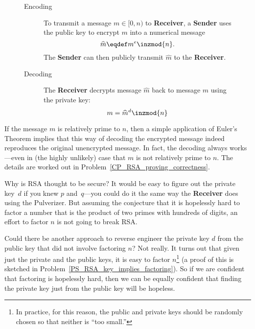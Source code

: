 \begin{figure}[p]
{\begin{minipage}{\textwidth}
\begin{description}
\item[Encoding]

\iffalse

Given a message~$m$, the sender first checks that $\gcd(m, n) =
1$.\footnote{It would be very bad if $\gcd(m, n)$ equals $p$ or $q$
  since then it would be easy for someone to use the encoded message
  to compute the private key If $\gcd(m, n) = n$, then the encoded
  message would be~0, which is fairly useless.  For very large values
  of~$n$, it is extremely unlikely that $\gcd(m, n) \ne 1$.  If this
  does happen, you should get a new set of keys or, at the very least,
  add some bits to~$m$ so that the resulting message is relatively
  prime to~$n$.}
\fi

To transmit a message $m \in [0,n)$ to \textbf{Receiver}, a \textbf{Sender} uses the public
  key to encrypt $m$ into a numerical message
\[
\widehat{m} \eqdef m^e \inzmod{n}. %
\]
The \textbf{Sender} can then publicly transmit $\widehat{m}$ to the \textbf{Receiver}.

\item[Decoding] The \textbf{Receiver} decrypts message $\widehat{m}$ back to message $m$ using the
  private key:
\[
m = \widehat{m}^d \inzmod{n} %
\]
\end{description}

\end{minipage}
}
\end{figure}

If the message $m$ is relatively prime to $n$, then a simple
application of Euler's Theorem implies that this way of decoding the
encrypted message indeed reproduces the original unencrypted message.
In fact, the decoding always works---even in (the highly unlikely)
case that $m$ is not relatively prime to $n$.  The details are worked
out in Problem~\ref{CP_RSA_proving_correctness}.

Why is RSA thought to be secure?  It would be easy to figure out the
private key~$d$ if you knew $p$ and~$q$---you could do it the same
way the \textbf{Receiver} does using the Pulverizer.  But assuming the
conjecture that it is hopelessly hard to factor a number that is the
product of two primes with hundreds of digits, an effort to factor $n$
is not going to break RSA.

Could there be another approach to reverse engineer the private key
$d$ from the public key that did not involve factoring $n$?  Not
really.  It turns out that given just the private and the public keys,
it is easy to factor $n$\footnote{In practice, for this reason, the
  public and private keys should be randomly chosen so that neither is
  ``too small.''}  (a proof of this is sketched in
Problem~\ref{PS_RSA_key_implies_factoring}).  So if we are confident
that factoring is hopelessly hard, then we can be equally confident
that finding the private key just from the public key will be
hopeless.

